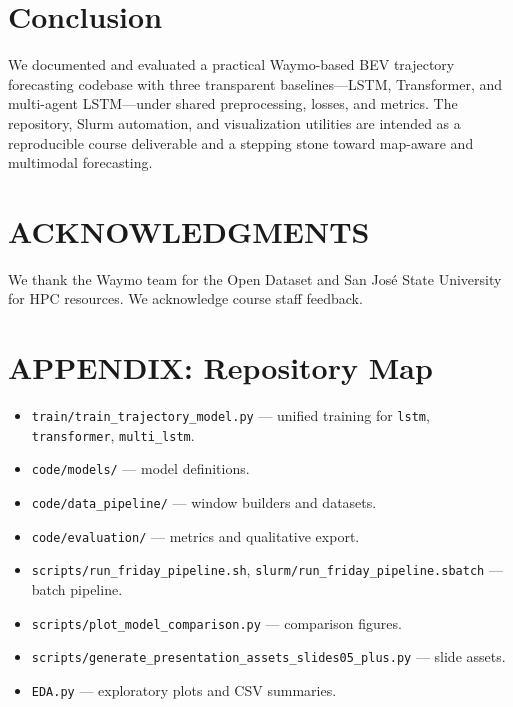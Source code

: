 \documentclass[letterpaper, 10 pt, conference]{ieeeconf}
\begin{document}
\section*{Conclusion}

We documented and evaluated a practical Waymo-based BEV trajectory forecasting codebase with three transparent baselines---LSTM, Transformer, and multi-agent LSTM---under shared preprocessing, losses, and metrics. The repository, Slurm automation, and visualization utilities are intended as a reproducible course deliverable and a stepping stone toward map-aware and multimodal forecasting.

\section*{ACKNOWLEDGMENTS}

We thank the Waymo team for the Open Dataset and San Jos\'{e} State University for HPC resources. We acknowledge course staff feedback.

\section*{APPENDIX: Repository Map}

\begin{itemize}
    \item \texttt{train/train\_trajectory\_model.py} --- unified training for \texttt{lstm}, \texttt{transformer}, \texttt{multi\_lstm}.
    \item \texttt{code/models/} --- model definitions.
    \item \texttt{code/data\_pipeline/} --- window builders and datasets.
    \item \texttt{code/evaluation/} --- metrics and qualitative export.
    \item \texttt{scripts/run\_friday\_pipeline.sh}, \texttt{slurm/run\_friday\_pipeline.sbatch} --- batch pipeline.
    \item \texttt{scripts/plot\_model\_comparison.py} --- comparison figures.
    \item \texttt{scripts/generate\_presentation\_assets\_slides05\_plus.py} --- slide assets.
    \item \texttt{EDA.py} --- exploratory plots and CSV summaries.
\end{itemize}
\end{document}
